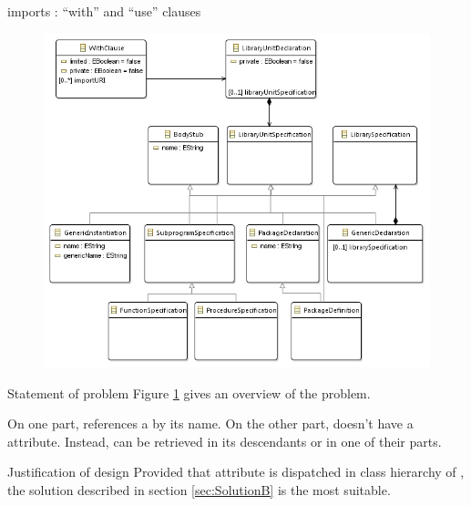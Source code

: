 \documentclass[a4paper]{prjdoc}
\begin{document}
  \begin{asection}{imports : ``with'' and ``use'' clauses}
    
     \begin{figure}
     \includegraphics[scale=0.85]{"../../model/Library units"}
     \label{fig:Library units}
     \end{figure} 
    
     \begin{asection}{Statement of problem}    
     Figure \ref {fig:Library units} gives an overview of the problem.
    
     On one part,  references a  by its name.
     On the other part,  doesn't have a  attribute.    
     Instead,  can be retrieved in its descendants or in one of their parts.    
     \end{asection} %
    
     \begin{asection}{Justification of design}
     Provided that  attribute is dispatched in class hierarchy of ,
     the solution described in section \ref{sec:SolutionB} is the most suitable.    
     \end{asection} %
	 
  \end{asection} %
  
\end{document}
